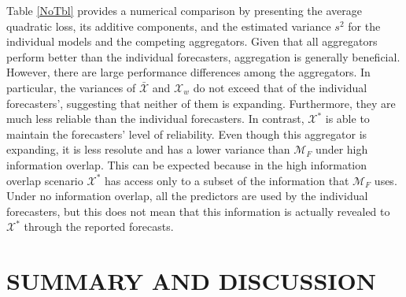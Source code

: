 \documentclass[12pt]{article}
\theoremstyle{definition}
\theoremstyle{definition}
\begin{document}
%
Table \ref{NoTbl} provides a numerical comparison by presenting the average quadratic loss, its additive components, and the estimated variance $s^2$ for the individual models and the competing aggregators.  Given that all aggregators perform better than the individual forecasters, aggregation is generally beneficial. However, there are large performance differences among the aggregators. In particular, the variances of $\bar{\mathcal{X}}$ and $\mathcal{X}_w$  do not exceed that of the individual forecasters', suggesting that neither of them is expanding. Furthermore, they are much less reliable than the individual forecasters. In contrast, $\mathcal{X}^*$ is able to maintain the forecasters' level of reliability. Even though this aggregator is expanding, it is less resolute and has a lower variance than $\mathcal{M}_F$ under high information overlap. This can be expected because in the high information overlap scenario $\mathcal{X}^*$ has access only to a subset of the information that $\mathcal{M}_F$ uses. Under no information overlap, all the predictors are  used by the individual forecasters, but this does not mean that this information is actually revealed to $\mathcal{X}^*$ through the reported forecasts. 

\section{SUMMARY AND DISCUSSION} \label{conclusion}
\end{document}
